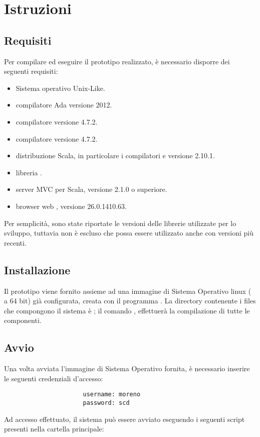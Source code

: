 \appendix
\chapter{Istruzioni}
	
	\section{Requisiti}
	
	Per compilare ed eseguire il prototipo realizzato, è necessario disporre dei seguenti requisiti:
	
	\begin{itemize}
		\item Sistema operativo Unix-Like.
		\item compilatore Ada  versione 2012.
		\item compilatore  versione 4.7.2.
		\item compilatore  versione 4.7.2.
		\item distribuzione Scala, in particolare i compilatori  e  versione 2.10.1.
		\item libreria .
		\item server MVC  per Scala, versione 2.1.0 o superiore.
		\item browser web , versione 26.0.1410.63.
	\end{itemize}
	
	Per semplicità, sono state riportate le versioni delle librerie utilizzate per lo sviluppo, tuttavia non è escluso che possa essere utilizzato anche con versioni più recenti.
	
	\section{Installazione}
	
	Il prototipo viene fornito assieme ad una immagine di Sistema Operativo linux ( a 64 bit) già configurata, creata con il programma . La directory contenente i files che compongono il sistema è ; il comando , effettuerà la compilazione di tutte le componenti.
	
	\section{Avvio}
	
	Una volta avviata l'immagine di Sistema Operativo fornita, è necessario inserire le seguenti credenziali d'accesso:
	\begin{verbatim}
                      username: moreno
                      password: scd
	\end{verbatim}
	Ad accesso effettuato, il sistema può essere avviato eseguendo i seguenti script presenti nella cartella principale:
	
